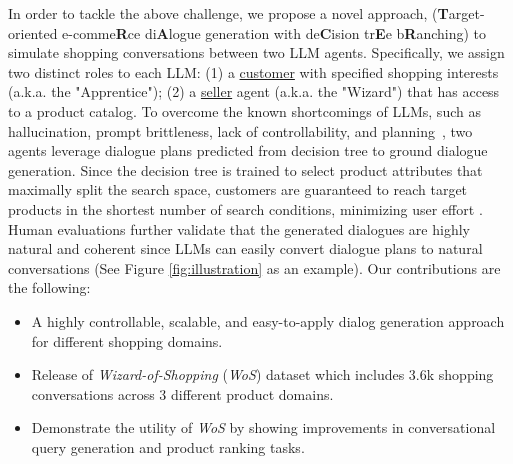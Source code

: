 In order to tackle the above challenge, we propose a novel approach, \method (\textbf{T}arget-oriented e-comme\textbf{R}ce di\textbf{A}logue generation with de\textbf{C}ision tr\textbf{E}e b\textbf{R}anching) to simulate shopping conversations between two LLM agents. Specifically, we assign two distinct roles to each LLM: (1) a \underline{customer} with specified shopping interests (a.k.a. the "Apprentice"); 
(2) a \underline{seller} agent (a.k.a. the "Wizard") that has access to a product catalog. %
%
To overcome the known shortcomings of LLMs, such as hallucination, prompt brittleness, lack of controllability, and planning~\cite{kaddour2023challenges}, 
two agents leverage dialogue plans predicted from decision tree to ground dialogue generation. Since the decision tree is trained to select product attributes that maximally split the search space, customers are guaranteed to reach target products in the shortest number of search conditions, minimizing user effort \cite{al2010review}. Human evaluations further validate that the generated dialogues are highly natural and coherent since LLMs can easily convert dialogue plans to natural conversations (See Figure \ref{fig:illustration} as an example). Our contributions are the following:
\vspace{-0.5em}
\begin{itemize}
\setlength\itemsep{-0.5em}
    \item A highly controllable, scalable, and easy-to-apply dialog generation approach \method for different shopping domains.
    \item Release of \textit{Wizard-of-Shopping} (\textit{WoS}) dataset which includes 3.6k shopping conversations across 3 different product domains.
    \item Demonstrate the utility of \textit{WoS} by showing improvements in conversational query generation and product ranking tasks.
\end{itemize}
